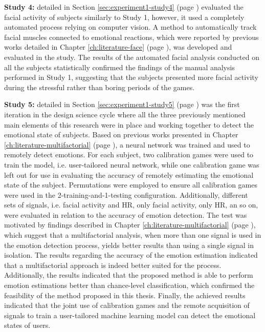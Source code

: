 \textbf{Study 4:} detailed in Section \ref{sec:experiment1-study4} (page \pageref{sec:experiment1-study4}) evaluated the facial activity of subjects similarly to Study 1, however, it used a completely automated process relying on computer vision. A method to automatically track facial muscles connected to emotional reactions, which were reported by previous works detailed in Chapter \ref{ch:literature-face} (page \pageref{ch:literature-face}), was developed and evaluated in the study. The results of the automated facial analysis conducted on all the subjects statistically confirmed the findings of the manual analysis performed in Study 1, suggesting that the subjects presented more facial activity during the stressful rather than boring periods of the games.

\textbf{Study 5:} detailed in Section \ref{sec:experiment1-study5} (page \pageref{sec:experiment1-study5}) was the first iteration in the design science cycle where all the three previously mentioned main elements of this research were in place and working together to detect the emotional state of subjects. Based on previous works presented in Chapter \ref{ch:literature-multifactorial} (page \pageref{ch:literature-multifactorial}), a neural network was trained and used to remotely detect emotions. For each subject, two calibration games were used to train the model, i.e. user-tailored neural network, while one calibration game was left out for use in evaluating the accuracy of remotely estimating the emotional state of the subject. Permutations were employed to ensure all calibration games were used in the 2-training-and-1-testing configuration. Additionally, different sets of signals, i.e. facial activity and HR, only facial activity, only HR, an so on, were evaluated in relation to the accuracy of emotion detection. The test was motivated by findings described in Chapter \ref{ch:literature-multifactorial} (page \pageref{ch:literature-multifactorial}), which suggest that a multifactorial analysis, when more than one signal is used in the emotion detection process, yields better results than using a single signal in isolation. The results regarding the accuracy of the emotion estimation indicated that a multifactorial approach is indeed better suited for the process. Additionally, the results indicated that the proposed method is able to perform emotion estimations better than chance-level classification, which confirmed the feasibility of the method proposed in this thesis. Finally, the achieved results indicated that the joint use of calibration games and the remote acquisition of signals to train a user-tailored machine learning model can detect the emotional states of users.


